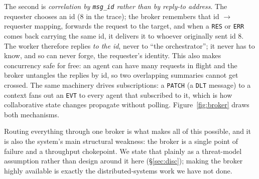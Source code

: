 \documentclass[11pt]{article}
\begin{document}
The second is \emph{correlation by \texttt{msg\_id} rather than by reply-to address}. The requester
chooses an id (8 in the trace); the broker remembers that id $\to$ requester mapping, forwards the
request to the target, and when a \texttt{RES} or \texttt{ERR} comes back carrying the same id, it
delivers it to whoever originally sent id 8. The worker therefore replies \emph{to the id}, never to
``the orchestrator''; it never has to know, and so can never forge, the requester's identity. This also
makes concurrency safe for free: an agent can have many requests in flight and the broker untangles the
replies by id, so two overlapping summaries cannot get crossed. The same machinery drives
subscriptions: a \texttt{PATCH} (a \texttt{DLT} message) to a context fans out an \texttt{EVT} to every
agent that subscribed to it, which is how collaborative state changes propagate without polling.
Figure~\ref{fig:broker} draws both mechanisms.

Routing everything through one broker is what makes all of this possible, and it is also the system's
main structural weakness: the broker is a single point of failure and a throughput chokepoint. We state
that plainly as a threat-model assumption rather than design around it here (\S\ref{sec:disc}); making
the broker highly available is exactly the distributed-systems work we have not done.
\end{document}

